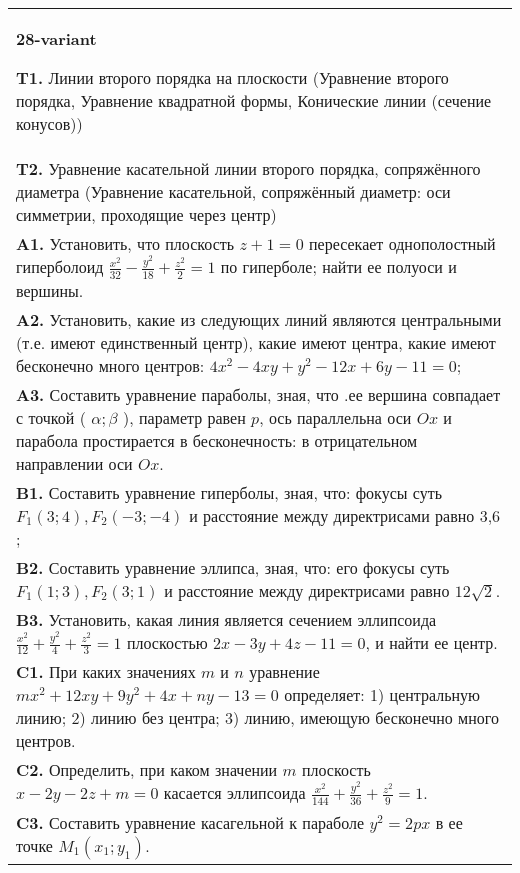\documentclass{article}
\begin{document}
\begin{tabular}{m{17cm}}
\textbf{28-variant}
\newline

\textbf{T1.} Линии второго порядка на плоскости (Уравнение второго порядка, Уравнение квадратной формы, Конические линии (сечение конусов)) \\
\textbf{T2.} Уравнение касательной линии второго порядка, сопряжённого диаметра (Уравнение касательной, сопряжённый диаметр: оси симметрии, проходящие через центр) \\
\textbf{A1.} Установить, что плоскость $z+1=0$ пересекает однополостный гиперболоид $\frac{x^2}{32}-\frac{y^2}{18}+\frac{z^2}{2}=1$ по гиперболе; найти ее полуоси и вершины. \\
\textbf{A2.} Установить, какие из следующих линий являются центральными (т.е. имеют единственный центр), какие имеют центра, какие имеют бесконечно много центров: $4 x^2-4 x y+y^2-12 x+6 y-11=0$; \\
\textbf{A3.} Составить уравнение параболы, зная, что .ее вершина совпадает с точкой ( $\alpha ; \beta$ ), параметр равен $p$, ось параллельна оси $O x$ и парабола простирается в бесконечность: в отрицательном направлении оси $O x$. \\
\textbf{B1.} Составить уравнение гиперболы, зная, что: фокусы суть $F_1(3 ; 4), F_2(-3 ;-4)$ и расстояние между директрисами равно 3,6 ; \\
\textbf{B2.} Составить уравнение эллипса, зная, что: его фокусы суть $F_1(1 ; 3), F_2(3 ; 1)$ и расстояние между директрисами равно $12 \sqrt{2}$. \\
\textbf{B3.} Установить, какая линия является сечением эллипсоида $\frac{x^2}{12}+\frac{y^2}{4}+\frac{z^2}{3}=1$ плоскостью $2 x-3 y+4 z-11=0$, и найти ее центр. \\
\textbf{C1.} При каких значениях $m$ и $n$ уравнение $m x^2+12 x y+9 y^2+4 x+n y-13=0$ определяет: 1) центральную линию; 2) линию без центра; 3) линию, имеющую бесконечно много центров. \\
\textbf{C2.} Определить, при каком значении $m$ плоскость $x-2 y-2 z+m=0$ касается эллипсоида $\frac{x^2}{144}+\frac{y^2}{36}+\frac{z^2}{9}=1$. \\
\textbf{C3.} Составить уравнение касагельной к параболе $y^2=2 p x$ в ее точке $M_1\left(x_1 ; y_1\right)$. \\

\end{tabular}
\vspace{1cm}
\end{document}
